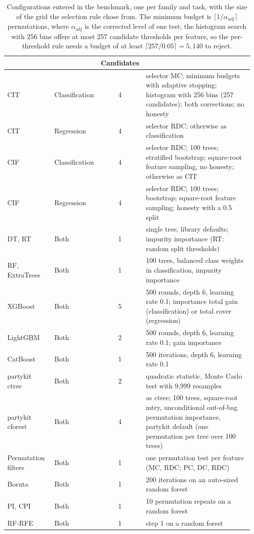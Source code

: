 \begin{table}[tb]
  \centering
  \footnotesize
  \setlength{\tabcolsep}{4pt}
  \begin{tabular}{@{}llcL{7.4cm}@{}}
    \toprule
     &  & Candidates &  \\
    \midrule
    CIT & Classification & 4 & selector MC; minimum budgets with adaptive stopping; histogram with 256 bins (257 candidates); both corrections; no honesty \\
    CIT & Regression & 4 & selector RDC; otherwise as classification \\
    CIF & Classification & 4 & selector RDC; 100 trees; stratified bootstrap; square-root feature sampling; no honesty; otherwise as CIT \\
    CIF & Regression & 4 & selector RDC; 100 trees; bootstrap; square-root feature sampling; honesty with a 0.5 split \\
    DT, RT & Both & 1 & single tree, library defaults; impurity importance (RT: random split thresholds) \\
    RF, ExtraTrees & Both & 1 & 100 trees, balanced class weights in classification, impurity importance \\
    XGBoost & Both & 5 & 500 rounds, depth 6, learning rate 0.1; importance total gain (classification) or total cover (regression) \\
    LightGBM & Both & 2 & 500 rounds, depth 6, learning rate 0.1; gain importance \\
    CatBoost & Both & 1 & 500 iterations, depth 6, learning rate 0.1 \\
    partykit ctree & Both & 2 & quadratic statistic, Monte Carlo test with 9,999 resamples \\
    partykit cforest & Both & 4 & as ctree; 100 trees, square-root mtry, unconditional out-of-bag permutation importance, partykit default (one permutation per tree over 100 trees) \\
    Permutation filters & Both & 1 & one permutation test per feature (MC, RDC; PC, DC, RDC) \\
    Boruta & Both & 1 & 200 iterations on an auto-sized random forest \\
    PI, CPI & Both & 1 & 10 permutation repeats on a random forest \\
    RF-RFE & Both & 1 & step 1 on a random forest \\
    \bottomrule
  \end{tabular}
  \caption{Configurations entered in the benchmark, one per family and task,
  with the size of the grid the selection rule chose from. The
  minimum budget is $\lceil 1/\alpha_{\mathrm{adj}} \rceil$ permutations,
  where $\alpha_{\mathrm{adj}}$ is the corrected level of one test; the histogram search with 256 bins offers at
  most 257 candidate thresholds per feature, so the per-threshold rule needs a
  budget of at least $\lceil 257/0.05 \rceil = 5{,}140$ to reject.}
  \label{tab:selected-configs}
\end{table}

